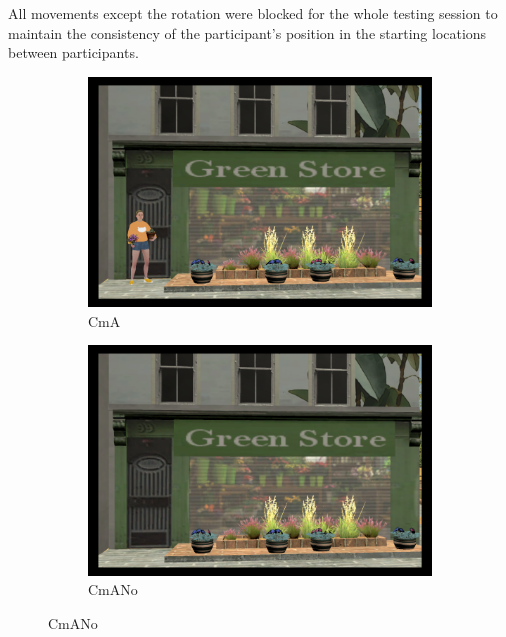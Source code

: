 All movements except the rotation were blocked for the whole testing session to maintain the consistency of the participant's position in the starting locations between participants. 

\begin{figure}[!htb]
	\centering
	\begin{subfigure}[b]{0.48\linewidth}
		\includegraphics[width=\linewidth]{figures/45_S(green store)_A.PNG}
		\caption{CmA}
		\label{fig:target_photos_a}
	\end{subfigure}
	\begin{subfigure}[b]{0.48\linewidth}
		\includegraphics[width=\linewidth]{figures/45_S(green store)_noA.PNG}
		\caption{CmANo}
		\label{fig:target_photos_b}
	\end{subfigure}
	

\end{figure}
